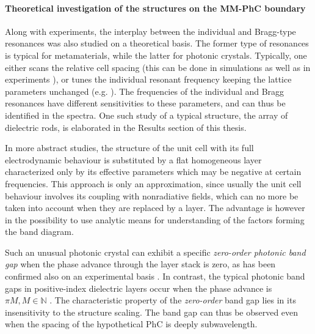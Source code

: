 \paragraph{Theoretical investigation of the structures on the MM-PhC boundary}%
Along with experiments, the interplay between the individual and Bragg-type resonances was also studied on a theoretical basis. The former type of resonances is typical for metamaterials, while the latter for photonic crystals. Typically, one either scans the relative cell spacing (this can be done in simulations \cite{shi2007, dominec2014transition} as well as in experiments \cite{rybin2015phase}),  %
or tunes the individual resonant frequency keeping the lattice parameters unchanged (e.g. \cite{chakrabarti2012magnetic}). The frequencies of the individual and Bragg resonances have different sensitivities to these parameters, and can thus be identified in the spectra. One such study of a typical structure, the array of dielectric rods, is elaborated in the Results section of this thesis.

% 

In more abstract studies, the structure of the unit cell with its full electrodynamic behaviour is substituted by a flat homogeneous layer characterized only by its effective parameters which may be negative at certain frequencies. %
This approach is only an approximation, since usually the unit cell behaviour involves its coupling with nonradiative fields, which can no more be taken into account when they are replaced by a layer. The advantage is however in the possibility to use analytic means for understanding of the factors forming the band diagram.

Such an unusual photonic crystal can exhibit a specific \textit{zero-order photonic band gap} \cite{li2003photonic, chen2006derivation, panoiu2006zero} when the phase advance through the layer stack is zero, as has been confirmed also on an experimental basis \cite{kocaman2011zero}. In contrast, the typical photonic band gaps in positive-index dielectric layers occur when the phase advance is $\pi M, M\in \mathbb{N}$ \cite{joannopoulos2011photonic}. 
The characteristic property of the \textit{zero-order} band gap lies in its insensitivity to the structure scaling. The band gap can thus be observed even when the spacing of the hypothetical PhC is deeply subwavelength.


